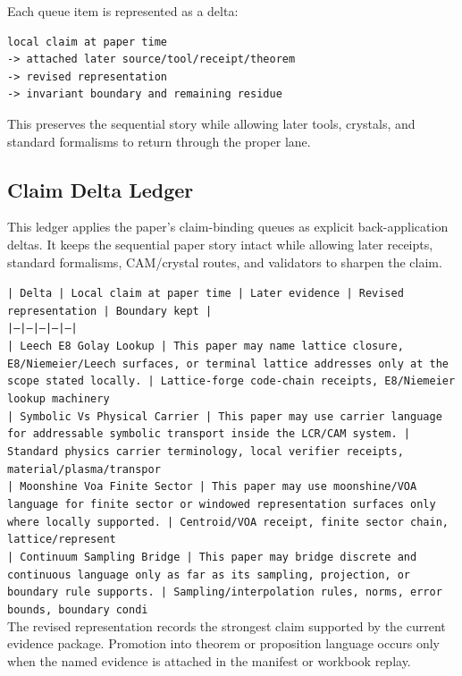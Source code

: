 \documentclass[11pt]{article}
\begin{document}
Each queue item is represented as a delta:

\begin{verbatim}
local claim at paper time
-> attached later source/tool/receipt/theorem
-> revised representation
-> invariant boundary and remaining residue
\end{verbatim}

This preserves the sequential story while allowing later tools, crystals, and
standard formalisms to return through the proper lane.

\subsection*{Claim Delta Ledger}

This ledger applies the paper's claim-binding queues as explicit back-application
deltas. It keeps the sequential paper story intact while allowing later
receipts, standard formalisms, CAM/crystal routes, and validators to sharpen the
claim.

\noindent\texttt{| Delta | Local claim at paper time | Later evidence | Revised representation | Boundary kept |}\\
\noindent\texttt{|---|---|---|---|---|}\\
\noindent\texttt{| Leech E8 Golay Lookup | This paper may name lattice closure, E8/Niemeier/Leech surfaces, or terminal lattice addresses only at the scope stated locally. | Lattice-forge code-chain receipts, E8/Niemeier lookup machinery}\\
\noindent\texttt{| Symbolic Vs Physical Carrier | This paper may use carrier language for addressable symbolic transport inside the LCR/CAM system. | Standard physics carrier terminology, local verifier receipts, material/plasma/transpor}\\
\noindent\texttt{| Moonshine Voa Finite Sector | This paper may use moonshine/VOA language for finite sector or windowed representation surfaces only where locally supported. | Centroid/VOA receipt, finite sector chain, lattice/represent}\\
\noindent\texttt{| Continuum Sampling Bridge | This paper may bridge discrete and continuous language only as far as its sampling, projection, or boundary rule supports. | Sampling/interpolation rules, norms, error bounds, boundary condi}\\

The revised representation records the strongest claim supported by the current evidence package. Promotion into theorem or proposition language occurs only when the named evidence is attached in the manifest or workbook replay.
\end{document}
